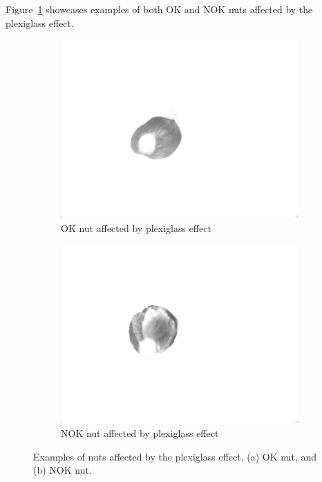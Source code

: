 \documentclass[12pt,DIV14,BCOR12mm,a4paper,footinclude=false,headinclude,parskip=half-,twoside,openright,cleardoublepage=empty,toc=index,bibliography=totoc,listof=totoc]{scrreprt}
\numberwithin{equation}{chapter}
\begin{document}
\begin{enumerate}
	Figure~\ref{fig:plexiglass_effect} showcases examples of both OK and NOK nuts affected by the plexiglass effect.

	\begin{figure}
		\centering
		\begin{subfigure}[b]{0.45\textwidth}
			\centering
			\includegraphics[scale=0.15]{../media/Nuts-influence-plexiglas-OK.png}
			\caption{OK nut affected by plexiglass effect}
		\end{subfigure}
		\hfill
		\begin{subfigure}[b]{0.45\textwidth}
			\centering
			\includegraphics[scale=0.15]{../media/Nuts-influence-plexiglas-NOK.png}
			\caption{NOK nut affected by plexiglass effect}
		\end{subfigure}
		\caption{Examples of nuts affected by the plexiglass effect. (a) OK nut, and (b) NOK nut.}
		\label{fig:plexiglass_effect}
	\end{figure}
\end{enumerate}
\end{document}

